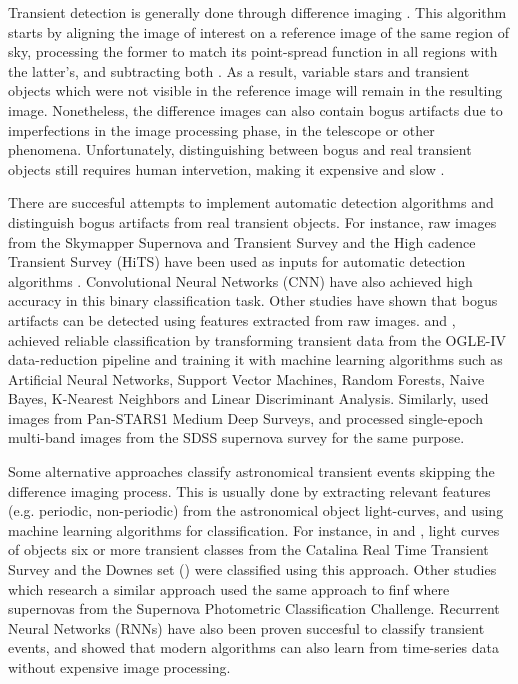 Transient detection is generally done through 
difference imaging \citep{1507.05137,1608.01733,1708.02850}. 
This algorithm starts by aligning the image of interest on a reference image of the
same region of sky, processing the former to match its point-spread
function in all regions with the latter's, and subtracting both
\citep{astro-ph/9712287}. 
As a result, variable stars and transient objects which were not
visible in the reference image will remain in the resulting
image. 
Nonetheless, the difference images can also contain bogus
artifacts due to imperfections in the image processing
phase, in the telescope or other phenomena. 
Unfortunately, distinguishing between bogus and real transient objects
still requires human intervetion, making it expensive and slow
\citep{2011arXiv1110.4655D}.  


There are succesful attempts to implement automatic detection
algorithms and distinguish bogus artifacts from real transient
objects.  
For instance, raw images from the  Skymapper Supernova and Transient
Survey and the High cadence Transient Survey (HiTS) have been used as
inputs for automatic detection algorithms \citep{1708.08947,1701.00458}.
Convolutional Neural Networks (CNN) have also achieved
high accuracy in this binary classification task.
Other studies have shown that bogus artifacts can be detected using
features extracted from raw images. 
\cite{1601.06151} and \cite{1601.06320}, achieved reliable
classification by transforming transient data from the OGLE-IV
data-reduction pipeline and training it with machine learning
algorithms such as Artificial Neural Networks, Support Vector
Machines, Random Forests, Naive Bayes, K-Nearest Neighbors and Linear
Discriminant Analysis.  
Similarly, \cite{1501.05470} used images from Pan-STARS1 Medium Deep
Surveys, and \cite{1407.4118} processed single-epoch multi-band images
from the SDSS supernova survey for the same purpose.  



Some alternative approaches classify astronomical transient
events skipping the difference imaging process. 
This is usually done by extracting relevant features (e.g. periodic,
non-periodic) from the astronomical object light-curves, and using
machine learning algorithms for classification. 
For instance, in \cite{1401.3211} and \cite{1601.03931}, light curves
of objects six or more transient classes from the Catalina Real Time
Transient Survey and the Downes set (\cite{d05}) were
classified using this approach. 
Other studies which research a similar approach
\cite{1603.00882} used the same approach to finf 
where supernovas from the Supernova Photometric Classification
Challenge.
Recurrent Neural Networks (RNNs) have also been proven succesful to
classify transient events, \cite{1606.07442} and \cite{1710.06804}
showed that  modern algorithms can also learn from time-series data
without expensive image processing.    


